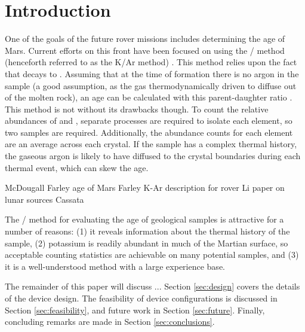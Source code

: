 \documentclass{mc2015}
\begin{document}
\section{Introduction}

One of the goals of the future rover missions includes determining the age of Mars. Current efforts on this front have been focused on using the / method (henceforth referred to as the K/Ar method) \cite{farley_situ_2014,farley_double-spike_2013,cassata_situ_2014}. This method relies upon the fact that  decays to . Assuming that at the time of formation there is no argon in the sample (a good assumption, as the gas thermodynamically driven to diffuse out of the molten rock), an age can be calculated with this parent-daughter ratio \cite{mcdougall_geochronology_1999}. This method is not without its drawbacks though. To count the relative abundances of  and , separate processes are required to isolate each element, so two samples are required. Additionally, the abundance counts for each element are an average across each crystal.
 If the sample has a complex thermal history, the gaseous argon is likely to have diffused to the crystal boundaries during each thermal event, which can skew the age.  

McDougall \cite{mcdougall_geochronology_1999}
Farley age of Mars \cite{farley_situ_2014}
Farley K-Ar description for rover \cite{farley_double-spike_2013}
Li paper on lunar sources \cite{li_evaluation_2011}
Cassata \cite{cassata_situ_2014}

The / method for evaluating the age of geological samples is attractive for a number of reasons: (1) it reveals information about the thermal history of the sample, (2) potassium is readily abundant in much of the Martian surface, so acceptable counting statistics are achievable on many potential samples, and (3) it is a well-understood method with a large experience base. 

The remainder of this paper will discuss ... Section \ref{sec:design} covers the details of the device design. The feasibility of device configurations is discussed in Section \ref{sec:feasibility}, and future work in Section \ref{sec:future}. Finally, concluding remarks are made in Section \ref{sec:conclusions}.

\end{document}

